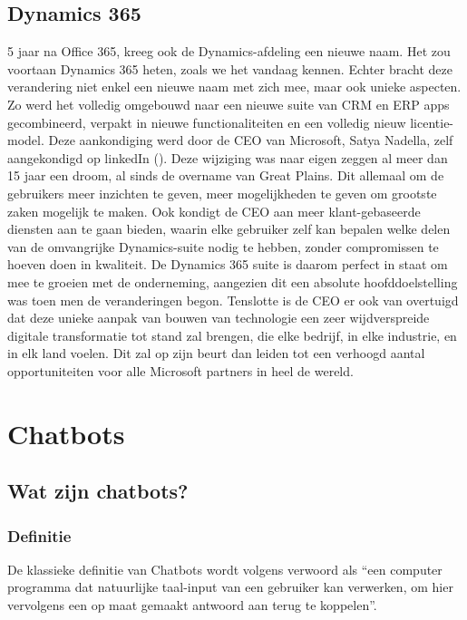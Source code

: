\subsection{Dynamics 365}
5 jaar na Office 365, kreeg ook de Dynamics-afdeling een nieuwe naam. Het zou voortaan Dynamics 365 heten, zoals we het vandaag kennen. Echter bracht deze verandering niet enkel een nieuwe naam met zich mee, maar ook unieke aspecten. Zo werd het volledig omgebouwd naar een nieuwe suite van CRM en ERP apps gecombineerd, verpakt in nieuwe functionaliteiten en een volledig nieuw licentie-model. 
Deze aankondiging werd door de CEO van Microsoft, Satya Nadella, zelf aangekondigd op linkedIn (\textcite{Nadella2016}). Deze wijziging was naar eigen zeggen al meer dan 15 jaar een droom, al sinds de overname van Great Plains. Dit allemaal om de gebruikers meer inzichten te geven, meer mogelijkheden te geven om grootste zaken mogelijk te maken. Ook kondigt de CEO aan meer klant-gebaseerde diensten aan te gaan bieden, waarin elke gebruiker zelf kan bepalen welke delen van de omvangrijke Dynamics-suite nodig te hebben, zonder compromissen te hoeven doen in kwaliteit. De Dynamics 365 suite is daarom perfect in staat om mee te groeien met de onderneming, aangezien dit een absolute hoofddoelstelling was toen men de veranderingen begon. 
Tenslotte is de CEO er ook van overtuigd dat deze unieke aanpak van bouwen van technologie een zeer wijdverspreide digitale transformatie tot stand zal brengen, die elke bedrijf, in elke industrie, en in elk land voelen. Dit zal op zijn beurt dan leiden tot een verhoogd aantal opportuniteiten voor alle Microsoft partners in heel de wereld. 


\section{Chatbots}
\subsection{Wat zijn chatbots?}
\subsubsection{Definitie}
De klassieke definitie van Chatbots wordt volgens \textcite{Khan2017} verwoord als “een computer programma dat natuurlijke taal-input van een gebruiker kan verwerken, om hier vervolgens een op maat gemaakt antwoord aan terug te koppelen”. 

 

